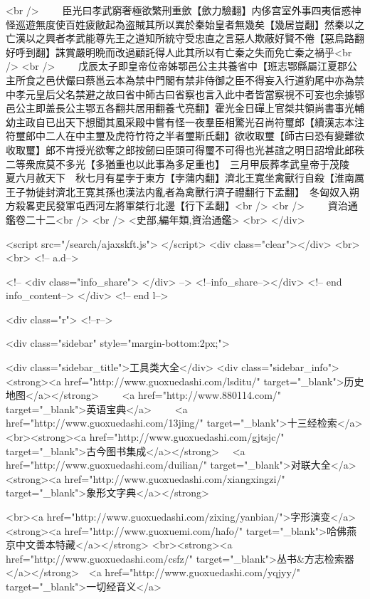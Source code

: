 <br />
　　臣光曰孝武窮奢極欲繁刑重歛【歛力驗翻】内侈宫室外事四夷信惑神怪巡遊無度使百姓疲敝起為盗賊其所以異於秦始皇者無幾矣【幾居豈翻】然秦以之亡漢以之興者孝武能尊先王之道知所統守受忠直之言惡人欺蔽好賢不倦【惡烏路翻好呼到翻】誅賞嚴明晩而改過顧託得人此其所以有亡秦之失而免亡秦之禍乎<br />
<br />
　　戊辰太子即皇帝位帝姊鄂邑公主共養省中【班志鄂縣屬江夏郡公主所食之邑伏儼曰蔡邕云本為禁中門閣有禁非侍御之臣不得妄入行道豹尾中亦為禁中孝元皇后父名禁避之故曰省中師古曰省察也言入此中者皆當察視不可妄也余據鄂邑公主即盖長公主鄂五各翻共居用翻養弋亮翻】霍光金日磾上官桀共領尚書事光輔幼主政自已出天下想聞其風采殿中嘗有怪一夜羣臣相驚光召尚符璽郎【續漢志本注符璽郎中二人在中主璽及虎符竹符之半者璽斯氏翻】欲收取璽【師古曰恐有變難欲收取璽】郎不肯授光欲奪之郎按劒曰臣頭可得璽不可得也光甚誼之明日詔增此郎秩二等衆庶莫不多光【多猶重也以此事為多足重也】　三月甲辰葬孝武皇帝于茂陵　夏六月赦天下　秋七月有星孛于東方【孛蒲内翻】濟北王寛坐禽獸行自殺【淮南厲王子勃徙封濟北王寛其孫也漢法内亂者為禽獸行濟子禮翻行下孟翻】　冬匈奴入朔方殺畧吏民發軍屯西河左將軍桀行北邊【行下孟翻】<br />
<br />
　　資治通鑑卷二十二<br />
<br />
<史部,編年類,資治通鑑>  <br>
   </div> 

<script src="/search/ajaxskft.js"> </script>
 <div class="clear"></div>
<br>
<br>
 <!-- a.d-->

 <!--
<div class="info_share">
</div> 
-->
 <!--info_share--></div>   <!-- end info_content-->
  </div> <!-- end l-->

<div class="r">   <!--r-->



<div class="sidebar"  style="margin-bottom:2px;">

 
<div class="sidebar_title">工具类大全</div>
<div class="sidebar_info">
<strong><a href="http://www.guoxuedashi.com/lsditu/" target="_blank">历史地图</a></strong>　　
<a href="http://www.880114.com/" target="_blank">英语宝典</a>　　
<a href="http://www.guoxuedashi.com/13jing/" target="_blank">十三经检索</a>　
<br><strong><a href="http://www.guoxuedashi.com/gjtsjc/" target="_blank">古今图书集成</a></strong>　
<a href="http://www.guoxuedashi.com/duilian/" target="_blank">对联大全</a>　<strong><a href="http://www.guoxuedashi.com/xiangxingzi/" target="_blank">象形文字典</a></strong>　

<br><a href="http://www.guoxuedashi.com/zixing/yanbian/">字形演变</a>　　<strong><a href="http://www.guoxuemi.com/hafo/" target="_blank">哈佛燕京中文善本特藏</a></strong>
<br><strong><a href="http://www.guoxuedashi.com/csfz/" target="_blank">丛书&方志检索器</a></strong>　<a href="http://www.guoxuedashi.com/yqjyy/" target="_blank">一切经音义</a>　　

